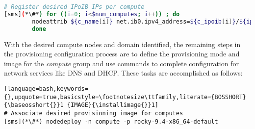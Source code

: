 \begin{lstlisting}[language=bash,keywords={},upquote=true,basicstyle=\footnotesize\ttfamily]
# Register desired IPoIB IPs per compute
[sms](*\#*) for ((i=0; i<$num_computes; i++)) ; do
		nodeattrib ${c_name[i]} net.ib0.ipv4_address=${c_ipoib[i]}/${ipoib_netmask}
        done
\end{lstlisting}

With the desired compute nodes and domain identified, the remaining steps in the
provisioning configuration process are to define the provisioning mode and
image for the {\em compute} group and use \Confluent{} commands to complete
configuration for network services like DNS and DHCP. These tasks are
accomplished as follows:

\begin{lstlisting}[language=bash,keywords={},upquote=true,basicstyle=\footnotesize\ttfamily,literate={BOSSHORT}{\baseosshort{}}1 {IMAGE}{\installimage{}}1]
# Associate desired provisioning image for computes
[sms](*\#*) nodedeploy -n compute -p rocky-9.4-x86_64-default
\end{lstlisting}


